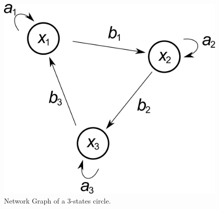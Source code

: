 \begin{figure}[h]
\centering
\includegraphics[scale=0.6]{figures/3VarCircle.png}
\caption{Network Graph of a $3$-states circle.}
\label{fig:Circle}
\end{figure}